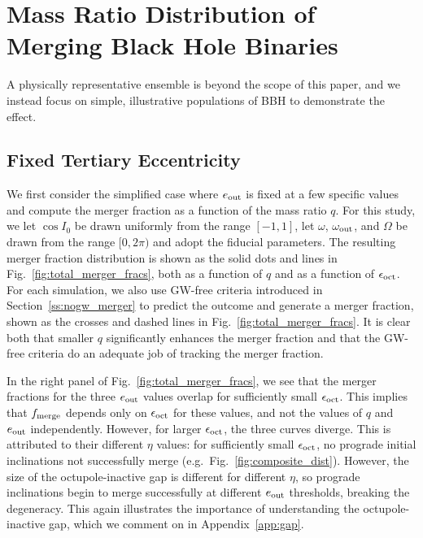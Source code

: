 \documentclass[
        fleqn,
        usenatbib,
    ]{mnras}
\begin{document}
\section{Mass Ratio Distribution of Merging Black Hole Binaries}

A physically representative ensemble is beyond the scope of this paper, and we
instead focus on simple, illustrative populations of BBH to demonstrate the
effect.

\subsection{Fixed Tertiary Eccentricity}

We first consider the simplified case where $e_{\rm out}$ is fixed at a few
specific values and compute the merger fraction as a function of the mass ratio
$q$. For this study, we let $\cos I_0$ be drawn uniformly from the range $[-1,
1]$, let $\omega$, $\omega_{\rm out}$, and $\Omega$ be drawn from the range $[0,
2\pi)$%
and adopt the fiducial parameters. The resulting merger fraction distribution is
shown as the solid dots and lines in Fig.~\ref{fig:total_merger_fracs}, both as
a function of $q$ and as a function of $\epsilon_{\rm oct}$. For each
simulation, we also use GW-free criteria introduced in
Section~\ref{ss:nogw_merger} to predict the outcome and generate a merger
fraction, shown as the crosses and dashed lines in
Fig.~\ref{fig:total_merger_fracs}. It is clear both that smaller $q$
significantly enhances the merger fraction and that the GW-free criteria do an
adequate job of tracking the merger fraction.

In the right panel of Fig.~\ref{fig:total_merger_fracs}, we see that the merger
fractions for the three $e_{\rm out}$ values overlap for sufficiently small
$\epsilon_{\rm oct}$. This implies that $f_{\rm merge}$ depends only on
$\epsilon_{\rm oct}$ for these values, and not the values of $q$ and $e_{\rm
out}$ independently. However, for larger $\epsilon_{\rm oct}$, the three curves
diverge. This is attributed to their different $\eta$ values: for sufficiently
small $\epsilon_{\rm oct}$, no prograde initial inclinations not successfully
merge (e.g.\ Fig.~\ref{fig:composite_dist}). However, the size of the
octupole-inactive gap is different for different $\eta$, so prograde
inclinations begin to merge successfully at different $e_{\rm out}$ thresholds,
breaking the degeneracy. This again illustrates the importance of understanding
the octupole-inactive gap, which we comment on in Appendix~\ref{app:gap}.
\end{document}
